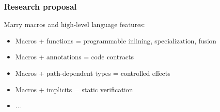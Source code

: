 \documentclass[hyperref={bookmarks=false}]{beamer}
\begin{document}
\begin{frame}[fragile]
\frametitle{Research proposal}

Marry macros and high-level language features:

\begin{itemize}
\item Macros + functions = programmable inlining, specialization, fusion
\item Macros + annotations = code contracts
\item Macros + path-dependent types = controlled effects
\item Macros + implicits = static verification
\item ...
\end{itemize}
\end{frame}
\end{document}
